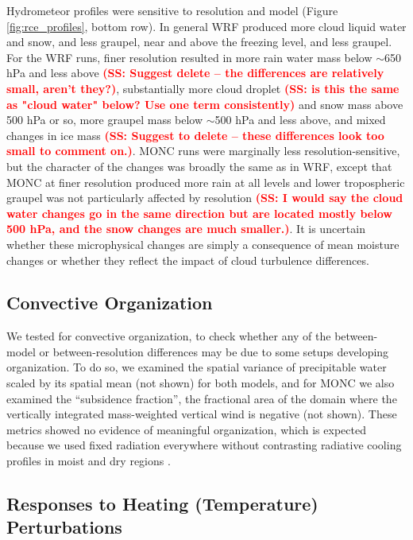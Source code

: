 \documentclass[draft]{agujournal2019}
\newcommand{\todo}[1]{\textcolor{red}{\textbf{(#1)}}}
\begin{document}
Hydrometeor profiles were sensitive to resolution and model (Figure
\ref{fig:rce_profiles}, bottom row). In general WRF produced more cloud liquid water and snow, and less graupel, near and above the freezing level, and less graupel. For the WRF runs, finer resolution resulted in more
rain water mass below $\sim$650 hPa and less above \todo{SS: Suggest delete -- the differences are relatively small, aren't they?}, substantially more cloud droplet \todo{SS: is this the same as "cloud water" below?  Use one term consistently} and snow
mass above 500 hPa or so, more graupel mass below $\sim$500 hPa and less above, and mixed changes in
ice mass \todo{SS: Suggest to delete -- these differences look too small to comment on.}. MONC runs were marginally less resolution-sensitive, but the character of the
changes was broadly the same as in WRF, except that MONC at finer resolution
produced more rain at all levels and lower tropospheric graupel was not
particularly affected by resolution \todo{SS: I would say the cloud water changes go in the same direction but are located mostly below 500 hPa, and the snow changes are much smaller.}. It
is uncertain whether these microphysical changes are simply a consequence of mean
moisture changes or whether they reflect the impact of cloud turbulence
differences.

\subsection{Convective Organization}

We tested for convective organization, to check whether any of the between-model
or between-resolution differences may be due to some setups developing
organization. To do so, we examined the spatial variance of precipitable water
scaled by its spatial mean (not shown) for both models, and for MONC we also
examined the ``subsidence fraction'', the fractional area of the domain where
the vertically integrated mass-weighted vertical wind is negative (not shown).
These metrics showed no evidence of meaningful organization, which is expected
because we used fixed radiation everywhere without contrasting radiative cooling
profiles in moist and dry regions \cite{Muller_GRL_2015}.

\subsection{Responses to Heating (Temperature) Perturbations}
\end{document}
